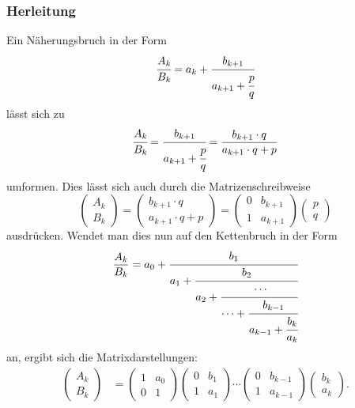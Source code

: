 \subsubsection{Herleitung}
Ein Näherungsbruch in der Form
%
\begin{align*}
	\cfrac{A_k}{B_k} = a_k + \cfrac{b_{k + 1}}{a_{k + 1} + \cfrac{p}{q}}
\end{align*}
lässt sich zu
\begin{align*}
	\cfrac{A_k}{B_k} = \cfrac{b_{k+1}}{a_{k+1} + \cfrac{p}{q}} = \frac{b_{k+1} \cdot q}{a_{k+1} \cdot q + p}
\end{align*}
umformen.
Dies lässt sich auch durch die Matrizenschreibweise
%
\begin{equation*}
	\begin{pmatrix}
		A_k\\
		B_k
	\end{pmatrix}
	= 		\begin{pmatrix}
		b_{k+1} \cdot q\\
		a_{k+1} \cdot q + p
	\end{pmatrix}
	=\begin{pmatrix}
		0&	b_{k+1}\\
		1&	a_{k+1}
	\end{pmatrix}
	\begin{pmatrix}
		p \\
		q
	\end{pmatrix}
\end{equation*}
ausdrücken.
Wendet man dies nun auf den Kettenbruch in der Form
\begin{equation*}
	\frac{A_k}{B_k} = a_0 + \cfrac{b_1}{a_1+\cfrac{b_2}{a_2+\cfrac{\cdots}{\cdots+\cfrac{b_{k-1}}{a_{k-1} + \cfrac{b_k}{a_k}}}}}
\end{equation*}
an, ergibt sich die Matrixdarstellungen:
\begin{align*}
	\begin{pmatrix}
		A_k\\
		B_k
	\end{pmatrix}
	&=
	\begin{pmatrix}
		1& a_0\\
		0& 1
	\end{pmatrix}
	\begin{pmatrix}
		0& b_1\\
		1& a_1
	\end{pmatrix}
	\cdots
	\begin{pmatrix}
		0& b_{k-1}\\
		1& a_{k-1}
	\end{pmatrix}
	\begin{pmatrix}
		b_k\\
		a_k
	\end{pmatrix}.
\end{align*}
